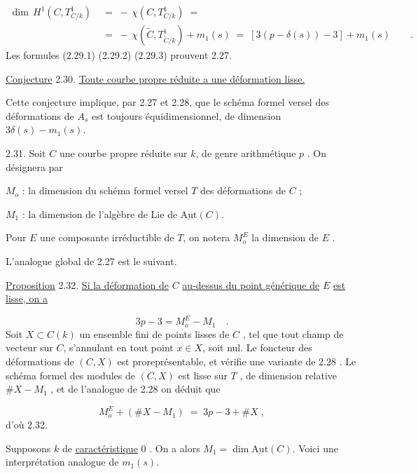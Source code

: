 \begin{equation}\tag{2.29.3}
\begin{aligned}\dim\, H^1(C,T^1_{C/k}) \;&=\; -\,\chi(C,T^1_{C/k}) \;=\; \\ &=\; -\,\chi(\widetilde{C},T^1_{\widetilde{C}/k}) + m_1(s) \;=\; [3(p-\delta(s))-3] + m_1(s) \qquad .\end{aligned}
\end{equation}
Les formules (2.29.1) (2.29.2) (2.29.3) prouvent 2.27.

\underline{Conjecture} 2.30. \quad \underline{Toute courbe propre réduite a une déformation lisse.}

Cette conjecture implique, par 2.27 et 2.28, que le schéma formel versel des déformations de $A_s$ est toujours équidimensionnel, de dimension $3\delta(s) - m_1(s)$.



2.31. Soit $C$ une courbe propre réduite sur $k$, de genre arithmétique $p$ . On désignera par

$M_o$ : la dimension du schéma formel versel $T$ des déformations de $C$ ;

$M_1$ : la dimension de l'algèbre de Lie de $\underline{\mathrm{Aut}}(C)$.

Pour $E$ une composante irréductible de $T$, on notera $M_o^E$ la dimension de $E$ .

L'analogue global de 2.27 est le suivant.

\underline{Proposition} 2.32. \underline{Si la déformation de} $C$ \underline{au-dessus du point générique de} $E$ \underline{est lisse, on a}

\begin{equation*}
3p-3 = M_o^E - M_1 \quad .
\end{equation*}
Soit $X \subset C(k)$ un ensemble fini de points lisses de $C$ , tel que tout champ de vecteur sur $C$, s'annulant en tout point $x \in X$, soit nul. Le foncteur des déformations de $(C,X)$ est proreprésentable, et vérifie une variante de 2.28 . Le schéma formel des modules de $(C,X)$ est lisse sur $T$ , de dimension relative $\# X - M_1$ , et de l'analogue de 2.28 on déduit que

\begin{equation*}
M_o^E + ( \# X - M_1) \;=\; 3p - 3 + \# X \; ,
\end{equation*}
d'où 2.32.

Supposons $k$ de \underline{caractéristique} $0$ . On a alors $M_1 = \dim \underline{\mathrm{Aut}}(C)$. Voici une interprétation analogue de $m_1(s)$.


